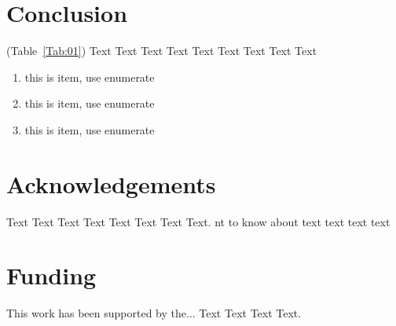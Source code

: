 \documentclass{bioinfo}
\begin{document}
%
%






\section{Conclusion}

(Table~\ref{Tab:01}) Text Text Text Text Text Text  Text Text Text

\begin{enumerate}
\item this is item, use enumerate
\item this is item, use enumerate
\item this is item, use enumerate
\end{enumerate}




\section*{Acknowledgements}

Text Text Text Text Text Text  Text Text. nt to know about  text
text text text\vspace*{-12pt}

\section*{Funding}

This work has been supported by the... Text Text  Text Text.\vspace*{-12pt}


%
%
%
%
%
%
%
%
  



\end{document}

